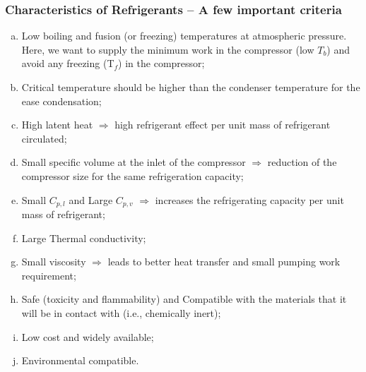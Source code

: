 \documentclass[10pt,compress,handout,ignorenonframetext]{beamer}
\begin{document}
\begin{frame}
 \frametitle{Characteristics of Refrigerants -- A few important criteria}
 \begin{enumerate}[(a)]
   \item <1-> Low boiling and fusion (or freezing) temperatures at atmospheric pressure. Here, we want to supply the minimum work in the compressor (low $T_{b}$) and avoid any freezing (T$_{f}$) in the compressor; 
   \item <2-> Critical temperature should be higher than the condenser temperature for the ease condensation;
   \item <3-> High latent heat $\Longrightarrow$ high refrigerant effect per unit mass of refrigerant circulated;
   \item <4-> Small specific volume at the inlet of the compressor $\Longrightarrow$ reduction of the compressor size for the same refrigeration capacity;
   \item <5-> Small $C_{p,l}$ and Large $C_{p,v}$ $\Longrightarrow$ increases the refrigerating capacity per unit mass of refrigerant;
   \item <6-> Large Thermal conductivity;
   \item <7-> Small viscosity $\Longrightarrow$ leads to better heat transfer and small pumping work requirement;
   \item <8-> Safe (toxicity and flammability) and Compatible with the materials that it will be in contact with (i.e., chemically inert);
   \item <10-> Low cost and widely available;
   \item <11-> Environmental compatible.
  \end{enumerate}
\end{frame}
\end{document}
